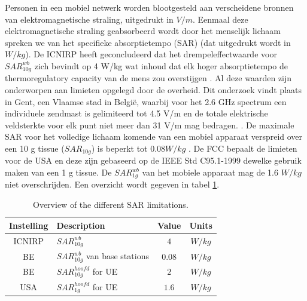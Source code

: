 \documentclass[twocolumn]{phdsymp_dutch}
\begin{document}
Personen in een mobiel netwerk worden blootgesteld aan verscheidene bronnen van elektromagnetische straling, uitgedrukt in $V/m$.
Eenmaal deze elektromagnetische straling geabsorbeerd wordt door het menselijk lichaam spreken we van het specifieke absorptietempo (\gls{SAR}) (dat uitgedrukt wordt in $W/kg$).
De \gls{ICNIRP} heeft geconcludeerd dat het drempeleffectwaarde voor $SAR^{wb}_{10g}$ zich bevindt op 
 4 W/kg wat inhoud dat elk hoger absorptietempo de \gls{thermoregulatory capacity} van de mens 
 zou overstijgen  \cite{J23,J24}.
Al deze waarden zijn onderworpen aan limieten opgelegd door de overheid.
Dit onderzoek vindt plaats in Gent, een Vlaamse stad in Belgi\"e, waarbij voor het 2.6 GHz spectrum een individuele zendmast 
is gelimiteerd tot 4.5 V/m en de totale elektrische veldsterkte voor elk punt niet meer dan 31 V/m mag bedragen.  \cite{J23,S13_normenBelgie}. 
De maximale \gls{SAR} voor het volledige lichaam komende van een mobiel apparaat verspreid over een 
10 g tissue ($SAR_{10g}$) is beperkt tot $0.08 W/kg$ \cite{J30,J23,S20}. 
De \gls{FCC} bepaalt de limieten voor de \gls{USA} en deze zijn gebaseerd op de 
\gls{IEEE} Std C95.1-1999 \cite{P1,P2} dewelke gebruik maken van een 1 g tissue.
De $SAR^{wb}_{1g}$ van het mobiele apparaat mag de 
1.6 $W/kg$ niet overschrijden. 
Een overzicht wordt gegeven in tabel \ref{table:overviewSARValues}.
\begin{table}[h!]
\centering
\begin{tabular}{|c|l|c|c|}
\hline
\textbf{Instelling}  & \textbf{Description}                  & \textbf{Value}  & \textbf{Units} \\ \hline
\gls{ICNIRP}          & $SAR^{wb}_{10g}$                      &  $4$            & $W/kg$              \\  \hline
BE                    & $SAR^{wb}_{10g}$ van base stations     & $0.08$          & $W/kg$               \\ \hline
BE                    & $SAR_{10g}^{hoofd}$ for \acs{UE}       & $2$             & $W/kg$               \\ \hline
\gls{USA}             & $SAR_{1g}^{hoofd}$ for \acs{UE}        & $1.6$           & $W/kg$               \\ \hline
\end{tabular}
\caption{Overview of the different \acs{SAR} limitations.}
\label{table:overviewSARValues}
\end{table}
\end{document}
